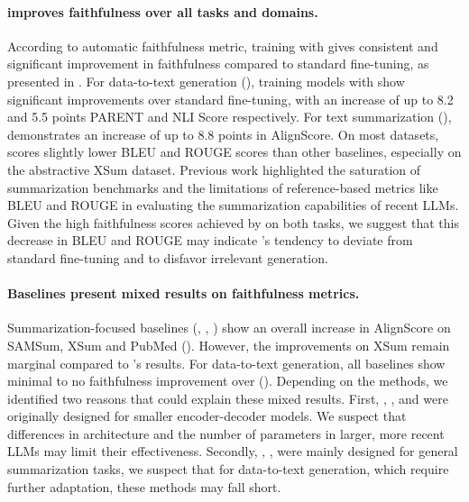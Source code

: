 


\paragraph{\scope improves faithfulness over all tasks and domains.} 
According to automatic faithfulness metric, training with \scope gives consistent and significant improvement in faithfulness compared to standard fine-tuning, as presented in .
For data-to-text generation (), training models with \scope show significant improvements over standard fine-tuning, with an increase of up to 8.2 and 5.5 points PARENT and NLI Score respectively. For text summarization (), \scope demonstrates an increase of up to 8.8 points in AlignScore.
On most datasets, \scope scores slightly lower BLEU and ROUGE scores than other baselines, especially on the abstractive XSum dataset.  Previous work \citep{goyal2022zeroshotnews} highlighted the saturation of summarization benchmarks and the limitations of reference-based metrics like BLEU and ROUGE in evaluating the summarization capabilities of recent LLMs. Given the high faithfulness scores achieved by \scope on both tasks, we suggest that this decrease in BLEU and ROUGE may indicate \scope's tendency to deviate from standard fine-tuning and to disfavor irrelevant generation.



\paragraph{Baselines present mixed results on faithfulness metrics.} 
Summarization-focused baselines (\cad, \pmi, \cliff) show an overall increase in AlignScore on SAMSum, XSum and PubMed (). However, the improvements on XSum remain marginal compared to \scope's results. For data-to-text generation, all baselines show minimal to no faithfulness improvement over \sft ().
Depending on the methods, we identified two reasons that could explain these mixed results. First, \cliff, \critic, and \pmi were originally designed for smaller encoder-decoder models. We suspect that differences in architecture and the number of parameters in larger, more recent LLMs may limit their effectiveness. Secondly, \cad, \pmi, \cliff were mainly designed for general summarization tasks, we suspect that for data-to-text generation, which require further adaptation, these methods may fall short.

